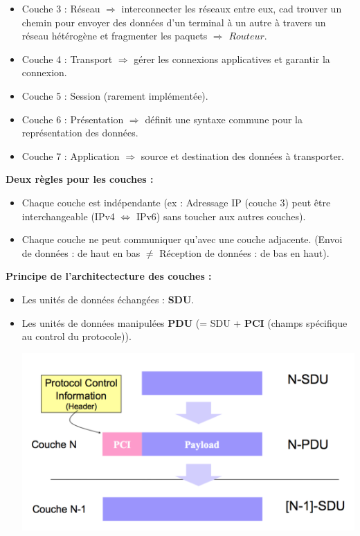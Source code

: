 \documentclass[a4paper,9pt, twocolumn]{article}
\begin{document}
\begin{itemize}
\item Couche 3 : Réseau $\Longrightarrow$ interconnecter les réseaux entre eux, cad trouver un chemin pour envoyer des données d'un terminal à un autre à travers un réseau hétérogène et fragmenter les paquets $\Longrightarrow$ $Routeur$.
\item Couche 4 : Transport $\Longrightarrow$ gérer les connexions applicatives et garantir la connexion.
\item Couche 5 : Session (rarement implémentée).
\item Couche 6 : Présentation $\Longrightarrow$ définit une syntaxe commune pour la représentation des données.
\item Couche 7 : Application $\Longrightarrow$ source et destination des données à transporter.
\end{itemize}

\textbf{Deux règles pour les couches : }
\begin{itemize}
\item Chaque couche est indépendante (ex : Adressage IP (couche 3) peut être interchangeable (IPv4 $\Leftrightarrow$ IPv6) sans toucher aux autres couches).
\item Chaque couche ne peut communiquer qu'avec une couche adjacente. (Envoi de données : de haut en bas $\neq$ Réception de données : de bas en haut).
\end{itemize}

\textbf{Principe de l'architectecture des couches : 
}
\begin{itemize}
\item Les unités de données échangées : \textbf{SDU}.
\item Les unités de données manipulées \textbf{PDU} (= SDU + \textbf{PCI} (champs spécifique au control du protocole)).

\includegraphics[scale=0.4]{PDU.png}
\end{itemize}
\end{document}

